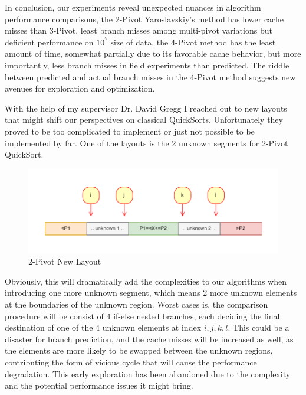 \documentclass{article}
\begin{document}
In conclusion, our experiments reveal unexpected nuances in algorithm performance comparisons, the 2-Pivot Yaroslavskiy's method has lower cache misses than 3-Pivot, least branch misses among multi-pivot variations but deficient performance on $10^7$ size of data, the 4-Pivot method has the least amount of time,
somewhat partially due to its favorable cache behavior, but more importantly, less branch misses in field experiments than predicted. The riddle between predicted and actual branch misses in the 4-Pivot method suggests new avenues for exploration and optimization.




With the help of my supervisor Dr. David Gregg I reached out to new layouts that might shift our perspectives on classical QuickSorts. Unfortunately they proved to be too complicated to implement or just not possible to be implemented by far.
One of the layouts is the 2 unknown segments for 2-Pivot QuickSort.

\begin{figure}[H]
    \hypertarget{fig:2pivotnewlayout}{}
    \caption{2-Pivot New Layout}
    \centering
    \hspace*{-0.27\textwidth}
    \includegraphics[width=1.5\textwidth]{2pivot_new_layout.drawio.pdf}
\end{figure}

Obviously, this will dramatically add the complexities to our algorithms when introducing one more unknown segment, which means 2 more unknown elements at the boundaries of the unknown region. Worst cases is, the comparison procedure will be consist of 4 if-else nested branches, each deciding the final destination of one of the 4 unknown elements at index $i, j, k, l$.
This could be a disaster for branch prediction, and the cache misses will be increased as well, as the elements are more likely to be swapped between the unknown regions, contributing the form of vicious cycle that will cause the performance degradation. This early exploration has been abandoned due to the complexity and the potential performance issues it might bring.
\end{document}
